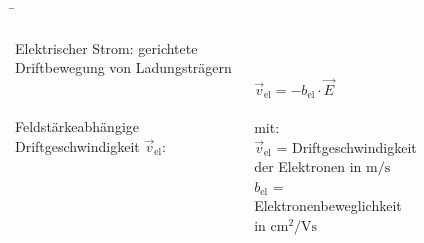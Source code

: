 \begin{frame}
	\b{

	

	

	
	\begin{columns}

	   Elektrischer Strom: gerichtete Driftbewegung von Ladungsträgern\\

	   \phantom{text}\\
	   \phantom{text}\\


	   Feldstärkeabhängige Driftgeschwindigkeit $\vec{v}_\mathrm{el}$:

		\phantom{.}\\
		\phantom{text}\\

		
		$\vec{v}_\mathrm{el} = - b_\mathrm{el} \cdot \vec{E}$\\

		\phantom{.}\\

		

		mit:\\
		 $\vec{v}_\mathrm{el}$ = Driftgeschwindigkeit der Elektronen in $\mathrm{m/s}$\\

		 $b_\mathrm{el}$ = Elektronenbeweglichkeit in $\mathrm{cm}^2/\mathrm{Vs}$





	

		


		\begin{figure}[h!]
						\centering
						
						

\end{figure}
\end{columns}}
\end{frame}
